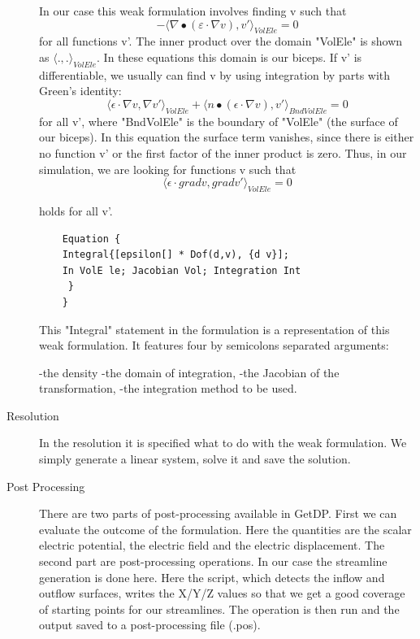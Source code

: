 \documentclass[preprint,journal]{vgtc}       %
\begin{document}
\begin{description}
	In our case this weak formulation involves finding v such that
	\[-\langle \nabla \bullet (\varepsilon \cdot \nabla v), v' \rangle _{VolEle}= 0\]
	for all functions v'. The inner product over the domain "VolEle" is shown as $\langle .,. \rangle _{VolEle}$. 
	In these equations this domain is our biceps. 
	If v' is differentiable, we usually can find v by using integration by parts with Green's identity:
	\[\langle \epsilon \cdot \nabla v, \nabla v' \rangle _{VolEle} + \langle n \bullet (\epsilon \cdot \nabla v), v' \rangle _{BndVolEle} =  0\]
	for all v', where "BndVolEle" is the boundary of "VolEle" (the surface of our biceps). 
	In this equation the surface term vanishes, since there is either no function v' or the first factor of the inner product is zero.
	Thus, in our simulation, we are looking for functions v such that 
	\[
	\langle {\epsilon \cdot \mathrel{grad} {v}, \mathrel{grad} v'} \rangle _{VolEle} =  0
	\]
	
	holds for all v'.
	\begin{verbatim} 
	Equation {
	Integral{[epsilon[] * Dof(d,v), {d v}]; 
	In VolE le; Jacobian Vol; Integration Int
	 }
	}
	\end{verbatim}
	
	This "Integral" statement in the formulation is a representation of this weak formulation. 
	It features four by semicolons separated arguments:
	
	-the density\newline
	-the domain of integration, \newline
	-the Jacobian of the transformation, \newline
	-the integration method to be used.
	
	\item[Resolution]
	In the resolution it is specified what to do with the weak formulation. 
	We simply generate a linear system, solve it and save the solution.  
	\item[Post Processing]
	There are two parts of post-processing available in GetDP. 
	First we can evaluate the outcome of the formulation. 
	Here the quantities are the scalar electric potential, the electric field and the electric displacement.
	The second part are post-processing operations. 
	In our case the streamline generation is done here. 
	Here the script, which detects the inflow and outflow surfaces, writes the X/Y/Z values so that we get a good coverage of starting points for our streamlines. 
	The operation is then run and the output saved to a post-processing file (.pos).
	\end{description}
\end{document}
